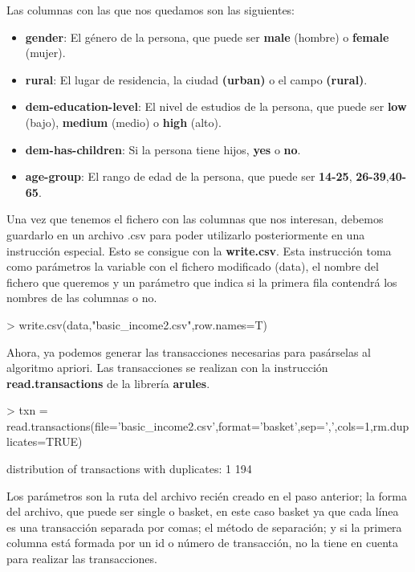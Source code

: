 \documentclass [a4paper] {article}
\begin{document}
Las columnas con las que nos quedamos son las siguientes:
\begin{itemize}
\item \textbf{gender}: El género de la persona, que puede ser \textbf{male} 
			(hombre) o \textbf{female} (mujer).
\item \textbf{rural}: El lugar de residencia, la ciudad \textbf{(urban)} 
			o el campo \textbf{(rural)}.
\item \textbf{dem-education-level}: El nivel de estudios de la persona, que puede ser
			\textbf{low} (bajo), \textbf{medium} (medio) o \textbf{high} (alto).
\item \textbf{dem-has-children}: Si la persona tiene hijos, \textbf{yes} o \textbf{no}.
\item \textbf{age-group}: El rango de edad de la persona, que puede ser \textbf{14-25},
			\textbf{26-39},\textbf{40-65}.
\end{itemize}
Una vez que tenemos el fichero con las columnas que nos interesan, debemos guardarlo en un archivo .csv para 
poder utilizarlo posteriormente en una instrucción especial. Esto se consigue con la \textbf{write.csv}. Esta
instrucción toma como parámetros la variable con el fichero modificado (data), el nombre del fichero que queremos
y un parámetro que indica si la primera fila contendrá los nombres de las columnas o no. 
\begin{Schunk}
\begin{Sinput}
> write.csv(data,"basic_income2.csv",row.names=T)
\end{Sinput}
\end{Schunk}
Ahora, ya podemos generar las transacciones necesarias para pasárselas al algoritmo apriori. Las transacciones se
realizan con la instrucción \textbf{read.transactions} de la librería \textbf{arules}. 
\begin{Schunk}
\begin{Sinput}
> txn = read.transactions(file='basic_income2.csv',format='basket',sep=',',cols=1,rm.duplicates=TRUE)
\end{Sinput}
\begin{Soutput}
distribution of transactions with duplicates:
  1 
194 
\end{Soutput}
\end{Schunk}
Los parámetros son la ruta del archivo recién creado en el paso anterior; la forma del archivo, que puede ser single
o basket, en este caso basket ya que cada línea es una transacción separada por comas; el método de separación; 
y si la primera columna está formada por un id o número de transacción, no la tiene en cuenta para realizar las transacciones.
\end{document}
